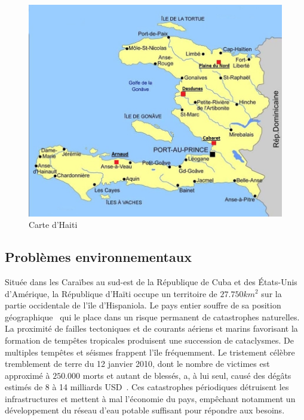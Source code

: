 \documentclass{EPL-master-thesis-covers-FR}
\begin{document}
			\begin{figure}[H]
					\includegraphics[width=\textwidth]{images/carte_haiti}
					\caption{Carte d'Haiti}
					\label{fig:carte_haiti}
				\end{figure}

			\subsection*{Problèmes environnementaux}

				Située dans les Caraïbes au sud-est de la République de Cuba et des \'Etats-Unis d'Amérique, la République d'Haïti occupe un territoire de $27.750km^{2}$ sur la partie occidentale de l'île d'Hispaniola. Le pays entier souffre de sa position géographique~\cite{ref:regards_situation_eau_haiti} qui le place dans un risque permanent de catastrophes naturelles. La proximité de failles tectoniques et de courants aériens et marins favorisant la formation de tempêtes tropicales produisent une succession de cataclysmes. De multiples tempêtes et séismes frappent l'île fréquemment. Le tristement célèbre tremblement de terre du 12 janvier 2010, dont le nombre de victimes est approximé à $250.000$ morts et autant de blessés, a, à lui seul, causé des dégâts estimés de 8 à 14 milliards USD~\cite{ref:estimating_economic_damage_earthquake_haiti}. Ces catastrophes périodiques détruisent les infrastructures et mettent à mal l'économie du pays, empêchant notamment un développement du réseau d'eau potable suffisant pour répondre aux besoins.
\end{document}
